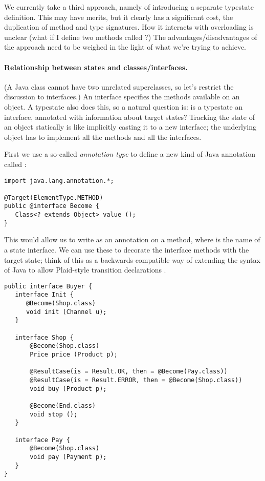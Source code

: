 We currently take a third approach, namely of introducing a separate
typestate definition. This may have merits, but it clearly has a
significant cost, the duplication of method and type signatures. How
it interacts with overloading is unclear (what if I define two methods
called ?) The advantages/disadvantages of the approach need
to be weighed in the light of what we're trying to achieve.

\paragraph{Relationship between states and classes/interfaces.}

(A Java class cannot have two unrelated superclasses, so let's
restrict the discussion to interfaces.) An interface specifies the
methods available on an object. A typestate also does this, so a
natural question is: is a typestate an interface, annotated with
information about target states? Tracking the state of an object
statically is like implicitly casting it to a new interface; the
underlying object has to implement all the methods and all the
interfaces.

First we use a so-called \emph{annotation type} to define a new kind
of Java annotation called :

\begin{lstlisting}
import java.lang.annotation.*;

@Target(ElementType.METHOD)
public @interface Become {
   Class<? extends Object> value ();
}
\end{lstlisting}

\noindent This would allow us to write  as
an annotation on a method, where  is the name of a state
interface. We can use these to decorate the interface methods with the
target state; think of this as a backwards-compatible way of extending
the syntax of Java to allow Plaid-style transition declarations
\cite{garcia14}.

\begin{lstlisting}
public interface Buyer {
   interface Init {
      @Become(Shop.class)
      void init (Channel u);
   }

   interface Shop {
       @Become(Shop.class)
       Price price (Product p);

       @ResultCase(is = Result.OK, then = @Become(Pay.class))
       @ResultCase(is = Result.ERROR, then = @Become(Shop.class))
       void buy (Product p);

       @Become(End.class)
       void stop ();
   }

   interface Pay {
       @Become(Shop.class)
       void pay (Payment p);
   }
}
\end{lstlisting}

